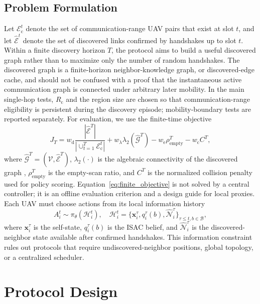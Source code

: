 \documentclass[journal]{IEEEtran}
\newcommand{\Rc}{R_{\mathrm{c}}}
\newcommand{\beamset}{\mathcal{B}}
\begin{document}
\subsection{Problem Formulation}
Let $\mathcal{E}_{\mathrm{c}}^t$ denote the set of communication-range UAV pairs that exist at slot $t$, and let $\hat{\mathcal{E}}^t$ denote the set of discovered links confirmed by handshakes up to slot $t$.
Within a finite discovery horizon $T$, the protocol aims to build a useful discovered graph rather than to maximize only the number of random handshakes.
The discovered graph is a finite-horizon neighbor-knowledge graph, or discovered-edge cache, and should not be confused with a proof that the instantaneous active communication graph is connected under arbitrary later mobility.
In the main single-hop tests, $\Rc$ and the region size are chosen so that communication-range eligibility is persistent during the discovery episode; mobility-boundary tests are reported separately.
For evaluation, we use the finite-time objective
\begin{equation}
  J_T =
  w_{\mathrm{d}} \frac{|\hat{\mathcal{E}}^T|}{|\cup_{t=1}^{T}\mathcal{E}_{\mathrm{c}}^t|}
  + w_{\lambda}\lambda_2(\hat{\mathcal{G}}^T)
  - w_{\mathrm{e}}\rho_{\mathrm{empty}}^T
  - w_{\mathrm{c}} C^T ,
  \label{eq:finite_objective}
\end{equation}
where $\hat{\mathcal{G}}^T=(\mathcal{V},\hat{\mathcal{E}}^T)$, $\lambda_2(\cdot)$ is the algebraic connectivity of the discovered graph \cite{Fiedler1973AlgebraicConnectivity}, $\rho_{\mathrm{empty}}^T$ is the empty-scan ratio, and $C^T$ is the normalized collision penalty used for policy scoring.
Equation~\eqref{eq:finite_objective} is not solved by a central controller; it is an offline evaluation criterion and a design guide for local proxies.
Each UAV must choose actions from its local information history
\begin{equation}
  A_i^t \sim \pi_\theta(\mathcal{H}_i^t), \quad
  \mathcal{H}_i^t = \{\mathbf{x}_i^\tau, q_i^\tau(b), \hat{\mathcal{N}}_i^\tau\}_{\tau \le t, b\in\beamset},
\end{equation}
where $\mathbf{x}_i^\tau$ is the self-state, $q_i^\tau(b)$ is the ISAC belief, and $\hat{\mathcal{N}}_i^\tau$ is the discovered-neighbor state available after confirmed handshakes.
This information constraint rules out protocols that require undiscovered-neighbor positions, global topology, or a centralized scheduler.

\section{Protocol Design}
\end{document}
